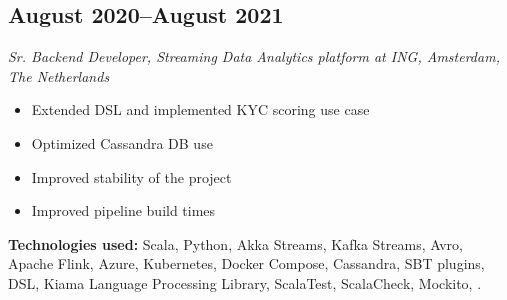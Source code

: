 \subsection*{August 2020--August 2021}

\textit{Sr. Backend Developer, Streaming Data Analytics platform at ING, Amsterdam, The Netherlands}

\begin{itemize}[noitemsep]
  \item Extended DSL and implemented KYC scoring use case
  \item Optimized Cassandra DB use
  \item Improved stability of the project
  \item Improved pipeline build times
\end{itemize}

\textbf{Technologies used:}
Scala, Python, Akka Streams, Kafka Streams, Avro, Apache Flink, Azure, Kubernetes, Docker Compose, Cassandra,
SBT plugins, DSL, Kiama Language Processing Library, ScalaTest, ScalaCheck, Mockito, .
